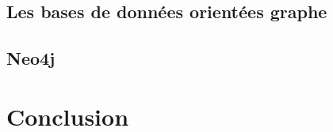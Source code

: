   \subsection{Les bases de données orientées graphe}
  \label{sec:graph-database-overview}
  \subsection{Neo4j}
  \label{neo4j}

\section{Conclusion}
\label{sec:conclusion-2}

